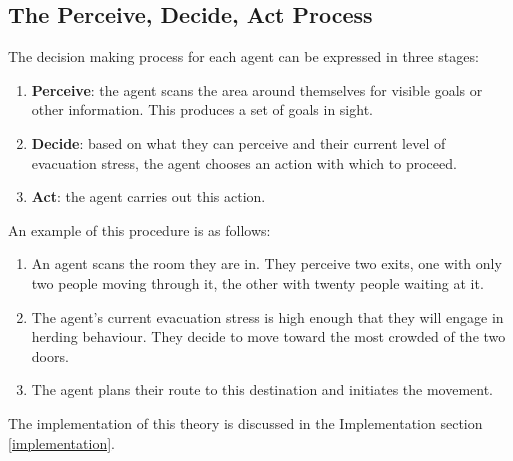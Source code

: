 \subsection{The Perceive, Decide, Act Process}
\label{Res:subsec:perceiveDecideAct}
The decision making process for each agent can be expressed in three stages:
\begin{enumerate}
  \item{\textbf{Perceive}: the agent scans the area around themselves for visible goals or other information. This produces a set of goals in sight.}
  \item{\textbf{Decide}: based on what they can perceive and their current level of evacuation stress, the agent chooses an action with which to proceed.}
  \item{\textbf{Act}: the agent carries out this action.}
\end{enumerate}
An example of this procedure is as follows:
\begin{enumerate}
  \item{An agent scans the room they are in. They perceive two exits, one with only two people moving through it, the other with twenty people waiting at it.}
  \item{The agent's current evacuation stress is high enough that they will engage in herding behaviour. They decide to move toward the most crowded of the two doors.}
  \item{The agent plans their route to this destination and initiates the movement.}
\end{enumerate}
 The implementation of this theory is discussed in the Implementation section \ref{implementation}.

%
%
%

